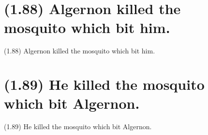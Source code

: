 \documentclass{article}
\begin{document}
\clearpage

%
%

\section*{(1.88) Algernon killed the mosquito which bit him.}

\bigbreak
\begin{enumerate*}
\item[(1.88)] Algernon killed the mosquito which bit him.
\end{enumerate*}
\bigbreak

\bigbreak
\begin{minipage}{\textwidth}
\end{minipage}
\bigbreak

\clearpage

%
%

\section*{(1.89) He killed the mosquito which bit Algernon.}

\bigbreak
\begin{enumerate*}
\item[(1.89)] He killed the mosquito which bit Algernon.
\end{enumerate*}
\bigbreak

\bigbreak
\begin{minipage}{\textwidth}
\end{minipage}
\bigbreak
\end{document}
